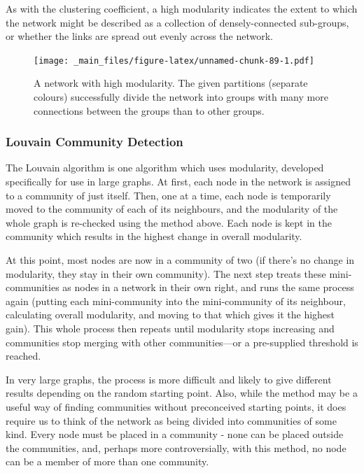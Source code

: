 \documentclass[
]{book}
\begin{document}
As with the clustering coefficient, a high modularity indicates the extent to which the network might be described as a collection of densely-connected sub-groups, or whether the links are spread out evenly across the network.

\begin{figure}
\centering
\texttt{[image: \_main\_files/figure-latex/unnamed-chunk-89-1.pdf]}
\caption{\label{fig:unnamed-chunk-89}A network with high modularity. The given partitions (separate colours) successfully divide the network into groups with many more connections between the groups than to other groups.}
\end{figure}

\hypertarget{louvain-community-detection}{%
\subsubsection{Louvain Community Detection}\label{louvain-community-detection}}

The Louvain algorithm is one algorithm which uses modularity, developed specifically for use in large graphs. At first, each node in the network is assigned to a community of just itself. Then, one at a time, each node is temporarily moved to the community of each of its neighbours, and the modularity of the whole graph is re-checked using the method above. Each node is kept in the community which results in the highest change in overall modularity.~

At this point, most nodes are now in a community of two (if there's no change in modularity, they stay in their own community). The next step treats these mini-communities as nodes in a network in their own right, and runs the same process again (putting each mini-community into the mini-community of its neighbour, calculating overall modularity, and moving to that which gives it the highest gain). This whole process then repeats until modularity stops increasing and communities stop merging with other communities---or a pre-supplied threshold is reached.

In very large graphs, the process is more difficult and likely to give different results depending on the random starting point. Also, while the method may be a useful way of finding communities without preconceived starting points, it does require us to think of the network as being divided into communities of some kind. Every node must be placed in a community - none can be placed outside the communities, and, perhaps more controversially, with this method, no node can be a member of more than one community.~
\end{document}
